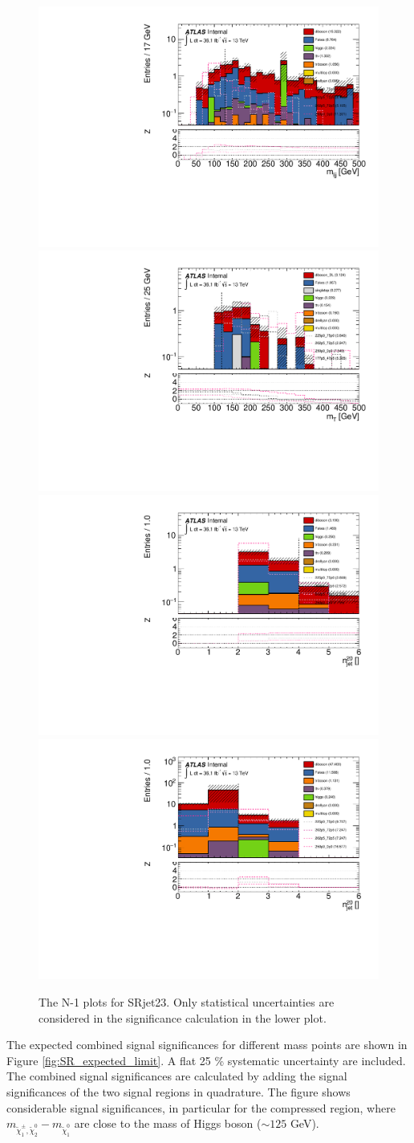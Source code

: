\begin{figure}[htpb]
\includegraphics[width=0.45\linewidth]{data/plot/SR_redefinition/SRjet23/hmljj_comb_fakes_upd.pdf}\includegraphics[width=0.45\linewidth]{data/plot/SR_redefinition/SRjet23/lemt_fakes.pdf}\\
\includegraphics[width=0.45\linewidth]{data/plot/SR_redefinition/SRjet23/hnJet20_fakes.pdf}\includegraphics[width=0.45\linewidth]{data/plot/SR_redefinition/SRjet23/lenJet20_fakes.pdf}\\
\caption{The N-1 plots for SRjet23. Only statistical uncertainties are considered in the significance calculation in the lower plot.}
\label{fig:SRjet23_N1}
\end{figure}

The expected combined signal significances for different mass points are shown in Figure \ref{fig:SR_expected_limit}.
A flat 25 \% systematic uncertainty are included.
The combined signal significances are calculated by adding the signal significances of the two signal regions in quadrature.
The figure shows considerable signal significances, in particular for the compressed region, where $m_{\tilde{\chi}_1^\pm , \tilde{\chi}_2^0} - m_{\tilde{\chi}_1^0}$ are close to the mass of Higgs boson ($\sim 125$ GeV).

